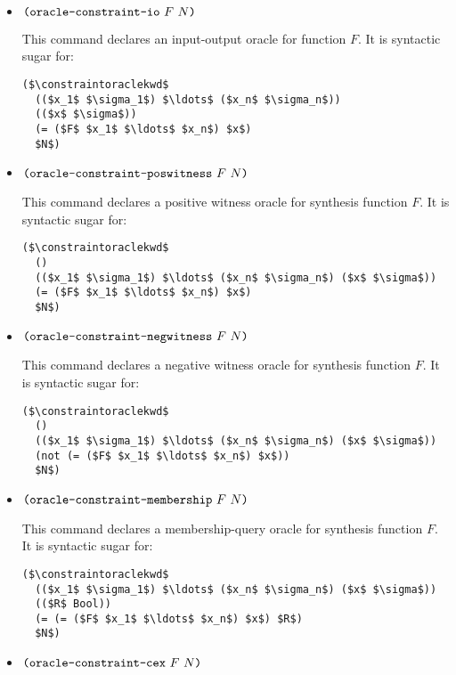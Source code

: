 \documentclass[english,a4paper,10pt]{article}
\begin{document}
\begin{itemize}
\item $\texttt{(}\texttt{oracle-constraint-io}\mbox{ }F\mbox{ } N\texttt{)}$

This command declares an input-output oracle for function $F$. 
It is syntactic sugar for:

\begin{lstlisting}[language=SyGuS-Desugar]
($\constraintoraclekwd$
  (($x_1$ $\sigma_1$) $\ldots$ ($x_n$ $\sigma_n$))
  (($x$ $\sigma$))
  (= ($F$ $x_1$ $\ldots$ $x_n$) $x$)
  $N$)
\end{lstlisting}

\item$\texttt{(}\texttt{oracle-constraint-poswitness}\mbox{ }F\mbox{ } N\texttt{)} $

This command declares a positive witness oracle for synthesis function $F$.
It is syntactic sugar for:

\begin{lstlisting}[language=SyGuS-Desugar]
($\constraintoraclekwd$
  ()
  (($x_1$ $\sigma_1$) $\ldots$ ($x_n$ $\sigma_n$) ($x$ $\sigma$))
  (= ($F$ $x_1$ $\ldots$ $x_n$) $x$)
  $N$)
\end{lstlisting}

\item$\texttt{(}\texttt{oracle-constraint-negwitness}\mbox{ }F\mbox{ } N\texttt{)}$

This command declares a negative witness oracle for synthesis function $F$.
It is syntactic sugar for:

\begin{lstlisting}[language=SyGuS-Desugar]
($\constraintoraclekwd$
  ()
  (($x_1$ $\sigma_1$) $\ldots$ ($x_n$ $\sigma_n$) ($x$ $\sigma$))
  (not (= ($F$ $x_1$ $\ldots$ $x_n$) $x$))
  $N$)
\end{lstlisting}

\item$\texttt{(}\texttt{oracle-constraint-membership}\mbox{ }F\mbox{ } N\texttt{)} $

This command declares a membership-query oracle for synthesis function $F$.
It is syntactic sugar for:

\begin{lstlisting}[language=SyGuS-Desugar]
($\constraintoraclekwd$
  (($x_1$ $\sigma_1$) $\ldots$ ($x_n$ $\sigma_n$) ($x$ $\sigma$))
  (($R$ Bool))
  (= (= ($F$ $x_1$ $\ldots$ $x_n$) $x$) $R$)
  $N$)
\end{lstlisting}

\item$\texttt{(}\texttt{oracle-constraint-cex}\mbox{ }F\mbox{ } N\texttt{)} $


\end{itemize}
\end{document}
